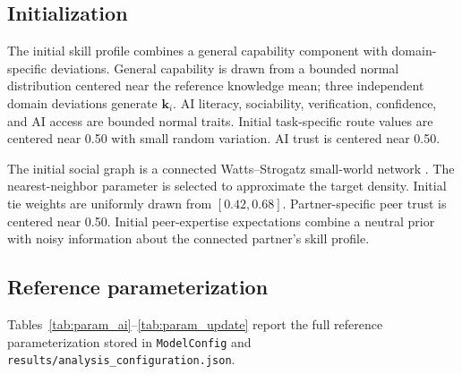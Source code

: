 \documentclass[11pt]{article}
\begin{document}
\subsection{Initialization}
The initial skill profile combines a general capability component with domain-specific deviations. General capability is drawn from a bounded normal distribution centered near the reference knowledge mean; three independent domain deviations generate $\mathbf{k}_i$. AI literacy, sociability, verification, confidence, and AI access are bounded normal traits. Initial task-specific route values are centered near 0.50 with small random variation. AI trust is centered near 0.50.

The initial social graph is a connected Watts--Strogatz small-world network \cite{watts1998collective}. The nearest-neighbor parameter is selected to approximate the target density. Initial tie weights are uniformly drawn from $[0.42,0.68]$. Partner-specific peer trust is centered near 0.50. Initial peer-expertise expectations combine a neutral prior with noisy information about the connected partner's skill profile.

\subsection{Reference parameterization}
Tables~\ref{tab:param_ai}--\ref{tab:param_update} report the full reference parameterization stored in \texttt{ModelConfig} and \texttt{results/analysis\_configuration.json}.
\end{document}
